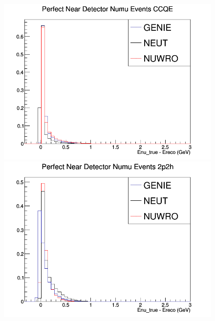 \documentclass[12pt]{article}
\begin{document}
\begin{figure}[h]
\centering
{}
\includegraphics[width=\linewidth]{Ereco_Etrue/numu_perfect_ND_CCQE.png}
\endminipage
{}
\includegraphics[width=\linewidth]{Ereco_Etrue/numu_perfect_ND_2p2h.png}

\end{figure}
\end{document}
